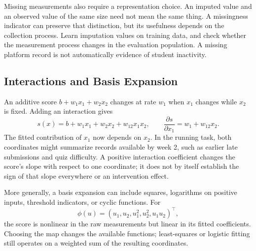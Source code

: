 Missing measurements also require a representation choice. An imputed value and an observed value of the same size need not mean the same thing. A missingness indicator can preserve that distinction, but its usefulness depends on the collection process. Learn imputation values on training data, and check whether the measurement process changes in the evaluation population. A missing platform record is not automatically evidence of student inactivity.

\subsection{Interactions and Basis Expansion}

An additive score $b+w_1x_1+w_2x_2$ changes at rate $w_1$ when $x_1$ changes while $x_2$ is fixed. Adding an interaction gives
\[
s(x)=b+w_1x_1+w_2x_2+w_{12}x_1x_2,
\qquad
\frac{\partial s}{\partial x_1}=w_1+w_{12}x_2.
\]
The fitted contribution of $x_1$ now depends on $x_2$. In the running task, both coordinates might summarize records available by week 2, such as earlier late submissions and quiz difficulty. A positive interaction coefficient changes the score's slope with respect to one coordinate; it does not by itself establish the sign of that slope everywhere or an intervention effect.

More generally, a basis expansion can include squares, logarithms on positive inputs, threshold indicators, or cyclic functions. For
\[
\phi(u)=(u_1,u_2,u_1^2,u_2^2,u_1u_2)^\top,
\]
the score is nonlinear in the raw measurements but linear in its fitted coefficients. Choosing the map changes the available functions; least-squares or logistic fitting still operates on a weighted sum of the resulting coordinates.

\par\addvspace{\intextsep}\noindent\begin{minipage}{\linewidth}
\centering
{}
\label{fig:linear-in-parameters}
\end{minipage}\par\addvspace{\intextsep}

